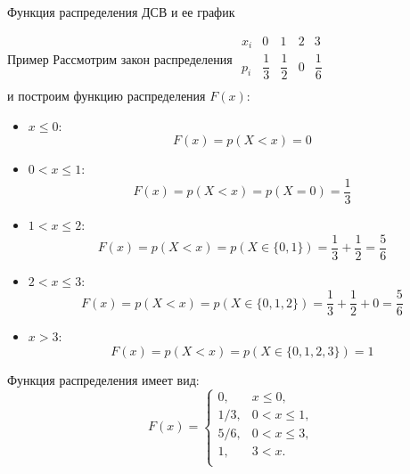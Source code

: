 \documentclass[unicode,11pt,notheorems,xcolor=table]{beamer}
\begin{document}
\begin{frame}[allowframebreaks]{Функция распределения ДСВ и ее график}{}
\begin{exampleblock}{Пример}
    Рассмотрим закон распределения
    \quad $
    \begin{array}{c|cccc}
        x_i& 0 &1 & 2& 3\\
        \hline
        p_i & \dfrac{1}{3} & \dfrac{1}{2}& 0 & \dfrac{1}{6}\\
    \end{array}
    $\\
    и построим функцию распределения $F(x)$:
\end{exampleblock}


    \begin{itemize}
        \item $x\leqslant 0$: 
        $$F(x)= p(X<x) = 0$$
        
        \item $0<x\leqslant 1$: $$F(x)= p(X<x) = p(X=0) = \frac{1}{3}$$
        
        \item $1<x\leqslant 2$: $$F(x)= p(X<x) = p(X\in \{0,1\}) = \frac{1}{3}+\frac{1}{2}= \frac{5}{6}$$
        
        \item $2<x\leqslant 3$: $$F(x)= p(X<x) = p(X\in \{0,1,2\}) = \frac{1}{3}+\frac{1}{2} + 0= \frac{5}{6}$$
        
        \item  $x>3$: $$F(x)= p(X<x) = p(X\in \{0,1,2,3\}) = 1$$

    \end{itemize}
    
    \framebreak

    Функция распределения имеет вид:
    $$
    F(x) = \begin{cases}
        0, &  x \leqslant 0,\\
        1/3, &  0<x \leqslant 1,\\
        5/6, &  0<x \leqslant 3,\\
        1, &  3<x. \\
        \end{cases}
    $$


\end{frame}
\end{document}
